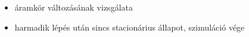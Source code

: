 {\begin{itemize}
\begin{itemize}
\begin{itemize}
\begin{itemize}
\item kimenetére kötött érték kiszámolása és kiadása
\end{itemize}
\item csomópont kiértékelése
\begin{itemize}
\setlength{\itemsep}{0cm}%
\setlength{\parskip}{0cm}%
\item bemenetén lévő érték lekérése
\item kimeneteire az érték kiadása
\end{itemize}
\item led kiértékelése (világít/nem világít kijelzése)
\end{itemize}
\item áramkör változásának vizsgálata
\item harmadik lépés után sincs stacionárius állapot, szimuláció vége
\end{itemize}
\end{itemize}
\vspace{-15pt}}


